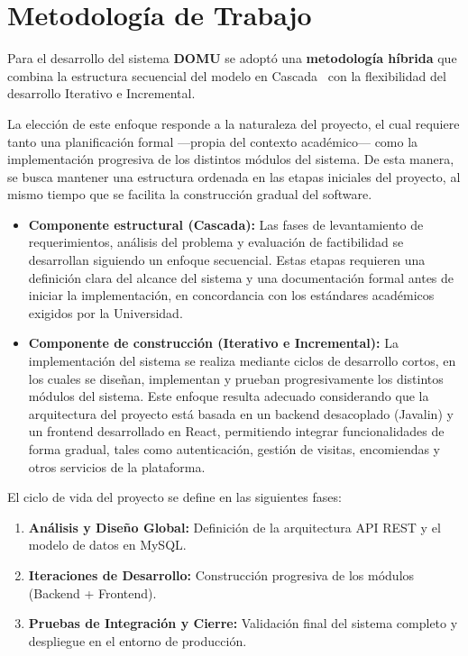 \section{Metodología de Trabajo}

Para el desarrollo del sistema \textbf{DOMU} se adoptó una \textbf{metodología híbrida} que combina la estructura secuencial del modelo en Cascada~\cite{royce1970} con la flexibilidad del desarrollo Iterativo e Incremental.

La elección de este enfoque responde a la naturaleza del proyecto, el cual requiere tanto una planificación formal —propia del contexto académico— como la implementación progresiva de los distintos módulos del sistema. De esta manera, se busca mantener una estructura ordenada en las etapas iniciales del proyecto, al mismo tiempo que se facilita la construcción gradual del software.

\begin{itemize}

\item \textbf{Componente estructural (Cascada):} Las fases de levantamiento de requerimientos, análisis del problema y evaluación de factibilidad se desarrollan siguiendo un enfoque secuencial. Estas etapas requieren una definición clara del alcance del sistema y una documentación formal antes de iniciar la implementación, en concordancia con los estándares académicos exigidos por la Universidad.

\item \textbf{Componente de construcción (Iterativo e Incremental):} La implementación del sistema se realiza mediante ciclos de desarrollo cortos, en los cuales se diseñan, implementan y prueban progresivamente los distintos módulos del sistema. Este enfoque resulta adecuado considerando que la arquitectura del proyecto está basada en un backend desacoplado (Javalin) y un frontend desarrollado en React, permitiendo integrar funcionalidades de forma gradual, tales como autenticación, gestión de visitas, encomiendas y otros servicios de la plataforma.

\end{itemize}

El ciclo de vida del proyecto se define en las siguientes fases:
\begin{enumerate}
    \item \textbf{Análisis y Diseño Global:} Definición de la arquitectura API REST y el modelo de datos en MySQL.
    \item \textbf{Iteraciones de Desarrollo:} Construcción progresiva de los módulos (Backend + Frontend).
    \item \textbf{Pruebas de Integración y Cierre:} Validación final del sistema completo y despliegue en el entorno de producción.
\end{enumerate}

